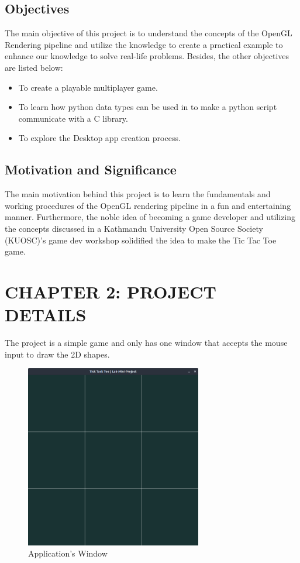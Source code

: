 \documentclass[12pt]{article}
\begin{document}
\subsection{Objectives}
The main objective of this project is to understand the concepts of the OpenGL Rendering pipeline and utilize the knowledge to create a practical example to enhance our knowledge to solve real-life problems. Besides, the other objectives are listed below:
\begin{itemize}
    \item To create a playable multiplayer game.
    \item To learn how python data types can be used in to make a python script communicate with a C library.
    \item To explore the Desktop app creation process.
\end{itemize}

\subsection{Motivation and Significance}
The main motivation behind this project is to learn the fundamentals and working procedures of the OpenGL rendering pipeline in a fun and entertaining manner. Furthermore, the noble idea of becoming a game developer and utilizing the concepts discussed in
a Kathmandu University Open Source Society (KUOSC)'s game dev workshop solidified the idea to make the Tic Tac Toe game.
\clearpage
\section{CHAPTER 2: PROJECT DETAILS}
The project is a simple game and only has one window that accepts the mouse input to draw the 2D shapes.\\


\begin{figure}[h]
    \centerline{\includegraphics[height=80mm]{InitialWindow.png}}
    \caption{Application's Window}
    \label{fig}
\end{figure}
\end{document}
